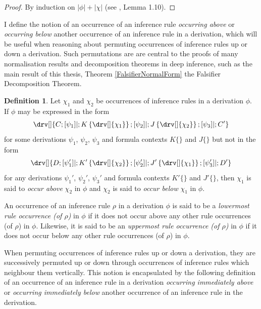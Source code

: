 \documentclass[10pt]{article}
\theoremstyle{definition}\newtheorem{remark}[theorem]{Remark}
\theoremstyle{definition}\newtheorem{example}[theorem]{Example}
\theoremstyle{definition}\newtheorem{definition}[theorem]{Definition}
\begin{document}
	\begin{proof}
		By induction on $| \phi | + | \chi |$ (see \cite{BenThesis}, Lemma 1.10).
	\end{proof}
	
	I define the notion of an occurrence of an inference rule \textit{occurring above} or \textit{occurring below} another occurrence of an inference rule in a derivation, which will be useful when reasoning about permuting occurrences of inference rules up or down a derivation. Such permutations are are central to the proofs of many normalisation results and decomposition theorems in deep inference, such as the main result of this thesis, Theorem \ref{FalsifierNormalForm} the Falsifier Decomposition Theorem.
	
	\begin{definition}
		Let $\chi_1$ and $\chi_2$ be occurrences of inference rules in a derivation $\phi$. If $\phi$ may be expressed in the form
		\[
			\drv[] {
				C ; [\psi_1]| ; K \left\{\drv[] {
					\chi_1
				} \right\} ; [\psi_2]| ; J \left\{\drv[] {
					\chi_2
				} \right\} ; [\psi_3]| ; C'
			}
		\]
		for some derivations $\psi_1$, $\psi_2$, $\psi_3$ and formula contexts $K \{\}$ and $J \{\}$ but not in the form
		\[
			\drv[] {
				D ; [\psi_1']| ; K' \left\{\drv[] {
					\chi_2
				} \right\} ; [\psi_2']| ; J' \left\{ \drv[] {
					\chi_1
				} \right\} ; [\psi_3']| ; D'
			}
		\]
		for any derivations $\psi_1'$, $\psi_2'$, $\psi_3'$ and formula contexts $K' \{\}$ and $J' \{\}$, then $\chi_1$ is said to \textit{occur above} $\chi_2$ in $\phi$ and $\chi_2$ is said to \textit{occur below} $\chi_1$ in $\phi$.
		
		An occurrence of an inference rule $\rho$ in a derivation $\phi$ is said to be a \textit{lowermost rule occurrence (of $\rho$)} in $\phi$ if it does not occur above any other rule occurrences (of $\rho$) in $\phi$. Likewise, it is said to be an \textit{uppermost rule occurrence (of $\rho$)} in $\phi$ if it does not occur below any other rule occurrences (of $\rho$) in $\phi$.
	\end{definition}
	
	When permuting occurrences of inference rules up or down a derivation, they are successively permuted up or down through occurrences of inference rules which neighbour them vertically. This notion is encapsulated by the following definition of an occurrence of an inference rule in a derivation \textit{occurring immediately above} or \textit{occurring immediately below} another occurrence of an inference rule in the derivation.
	
\end{document}
